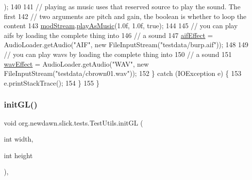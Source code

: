 \begin{DoxyCode}
      );
140 
141             \textcolor{comment}{// playing as music uses that reserved source to play the sound. The first}
142             \textcolor{comment}{// two arguments are pitch and gain, the boolean is whether to loop the content}
143             \mbox{\hyperlink{classorg_1_1newdawn_1_1slick_1_1tests_1_1_test_utils_a976c40b2829c394a1bdead2aac1125a4}{modStream}}.\mbox{\hyperlink{interfaceorg_1_1newdawn_1_1slick_1_1openal_1_1_audio_a9a13784b5ec9ce06c8756f98b00e05ab}{playAsMusic}}(1.0f, 1.0f, \textcolor{keyword}{true});
144             
145             \textcolor{comment}{// you can play aifs by loading the complete thing into }
146             \textcolor{comment}{// a sound}
147             \mbox{\hyperlink{classorg_1_1newdawn_1_1slick_1_1tests_1_1_test_utils_af8f2ad43fbdbdc89b483f080da4ded88}{aifEffect}} = AudioLoader.getAudio(\textcolor{stringliteral}{"AIF"}, \textcolor{keyword}{new} FileInputStream(\textcolor{stringliteral}{"testdata/burp.aif"}));
148 
149             \textcolor{comment}{// you can play wavs by loading the complete thing into }
150             \textcolor{comment}{// a sound}
151             \mbox{\hyperlink{classorg_1_1newdawn_1_1slick_1_1tests_1_1_test_utils_a1b40069da828fdd5131e127a1db4e1f3}{wavEffect}} = AudioLoader.getAudio(\textcolor{stringliteral}{"WAV"}, \textcolor{keyword}{new} FileInputStream(\textcolor{stringliteral}{"testdata/cbrown01.wav"}));
152         \} \textcolor{keywordflow}{catch} (IOException e) \{
153             e.printStackTrace();
154         \}
155     \}
\end{DoxyCode}
\mbox{\label{classorg_1_1newdawn_1_1slick_1_1tests_1_1_test_utils_aa258422cf2a025183e44eb3a13b66e3f}} 
\subsubsection{\texorpdfstring{init\+G\+L()}{initGL()}}
{\footnotesize\ttfamily void org.\+newdawn.\+slick.\+tests.\+Test\+Utils.\+init\+GL (\begin{DoxyParamCaption}\item[{int}]{width,  }\item[{int}]{height }\end{DoxyParamCaption})\hspace{0.3cm}{\ttfamily [inline]}, {\ttfamily [private]}}

